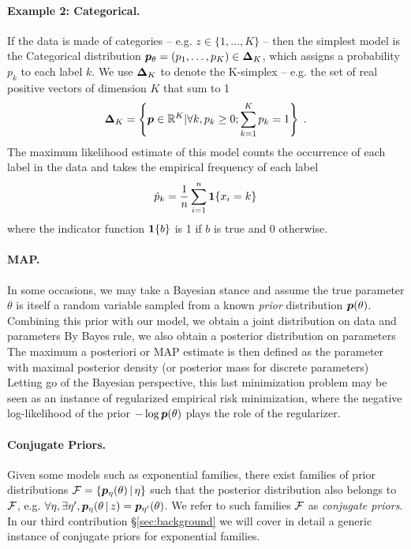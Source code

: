 \paragraph{Example 2: Categorical.}
If the data is made of categories -- e.g.  $z \in \{1, \dots, K\}$ -- then the simplest model is the Categorical distribution $\bm{p}_{\theta} = (p_1, \dots, p_K) \in \bm{\Delta}_K$, which assigns a probability $p_k$ to each label $k$. We use $\bm{\Delta}_K$ to denote the K-simplex -- e.g. the set of real positive vectors of dimension $K$ that sum to 1
\begin{align}
    \bm{\Delta}_K = \left\{ {\bm{p}} \in \mathbb{R}^K | \forall k, p_k \ge 0 ; \sum_{k=1}^K  p_k = 1 \right\} \; .
\end{align}
The maximum likelihood estimate of this model counts the occurrence of each label in the data and takes the empirical frequency of each label
\begin{align}
    \hat p_k  = \frac{1}{n} \sum_{i=1}^n \operatorname{\mathbf{1}}\{x_i = k\}
\end{align}
where the indicator function $\operatorname{\mathbf{1}}\{ b\}$ is 1 if $b$ is true and 0 otherwise.

\paragraph{MAP.}
In some occasions, we may take a Bayesian stance and assume the true parameter $\theta$ is itself a random variable sampled from a known \emph{prior} distribution $\bm{p}(\theta)$. 
Combining this prior with our model, we obtain a joint distribution on data and parameters 
By Bayes rule, we also obtain a posterior distribution on parameters 
The maximum a posteriori or MAP estimate is then defined as the parameter with maximal posterior density (or posterior mass for discrete parameters)
Letting go of the Bayesian perspective, this last minimization problem may be seen as an instance of regularized empirical risk minimization, where the negative log-likelihood of the prior $- \log \bm{p}(\theta)$ plays the role of the regularizer.

\paragraph{Conjugate Priors.}
Given some models such as exponential families, there exist families of prior distributions ${\mathcal F} = \{\bm{p}_\eta (\theta) \,\vert\, \eta\}$ 
such that the posterior distribution also belongs to ${\mathcal F}$, 
e.g.  $\forall \eta, \exists \eta', \bm{p}_\eta (\theta \,\vert\, z) = \bm{p}_{\eta'}(\theta)$.
We refer to such families ${\mathcal F}$ as \emph{conjugate priors}.
In our third contribution \S\ref{sec:background} we will cover in detail a generic instance of conjugate priors for exponential families.


